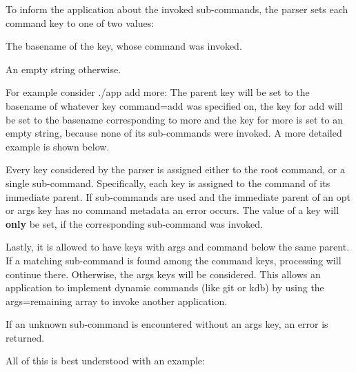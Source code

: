 To inform the application about the invoked sub-\/commands, the parser sets each {\ttfamily command} key to one of two values\+:


\begin{DoxyItemize}
\item The basename of the key, whose command was invoked.
\item An empty string otherwise.
\end{DoxyItemize}

For example consider {\ttfamily ./app add more}\+: The parent key will be set to the basename of whatever key {\ttfamily command=add} was specified on, the key for {\ttfamily add} will be set to the basename corresponding to {\ttfamily more} and the key for {\ttfamily more} is set to an empty string, because none of its sub-\/commands were invoked. A more detailed example is shown below.

Every key considered by the parser is assigned either to the root command, or a single sub-\/command. Specifically, each key is assigned to the command of its immediate parent. If sub-\/commands are used and the immediate parent of an {\ttfamily opt} or {\ttfamily args} key has no {\ttfamily command} metadata an error occurs. The value of a key will {\bfseries only} be set, if the corresponding sub-\/command was invoked.

Lastly, it is allowed to have keys with {\ttfamily args} and {\ttfamily command} below the same parent. If a matching sub-\/command is found among the {\ttfamily command} keys, processing will continue there. Otherwise, the {\ttfamily args} keys will be considered. This allows an application to implement dynamic commands (like {\ttfamily git} or {\ttfamily kdb}) by using the {\ttfamily args=remaining} array to invoke another application.

If an unknown sub-\/command is encountered without an {\ttfamily args} key, an error is returned.

All of this is best understood with an example\+:


